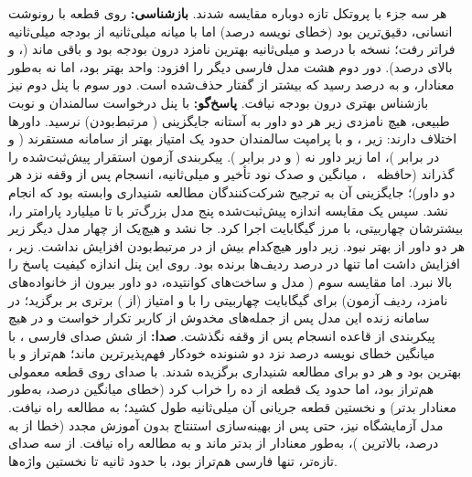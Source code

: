 هر سه جزء با پروتکل تازه دوباره مقایسه شدند. \textbf{بازشناسی:} روی 
قطعه  با رونوشت انسانی،  دقیق‌ترین بود (خطای نویسه
 درصد) اما با میانه  میلی‌ثانیه از بودجه  میلی‌ثانیه
فراتر رفت؛  نسخه  با  درصد و  میلی‌ثانیه بهترین
نامزد درون بودجه بود و باقی ماند (،  و
 بالای  درصد). دور دوم هشت مدل فارسی دیگر را افزود:
  واحد بهتر بود، اما نه به‌طور معنادار، و
 به  درصد رسید که بیشتر از گفتار حذف‌شده است. دور سوم با پنل دوم  نیز بازشناس بهتری درون بودجه نیافت.
\textbf{پاسخ‌گو:} با پنل  درخواست
سالمندان و  نوبت طبیعی، هیچ نامزدی زیر هر دو داور به آستانه جایگزینی
( مرتبط‌بودن) نرسید. داورها اختلاف دارند: زیر ،
 و  با پرامپت سالمندان حدود یک امتیاز بهتر از سامانه
مستقرند ( و  در برابر )، اما زیر داور  نه
( و  در برابر ). پیکربندی  آزمون استقرار
پیش‌ثبت‌شده را گذراند (حافظه ~، میانگین و صدک نود تأخیر  و
 میلی‌ثانیه، انسجام پس از وقفه نزد هر دو داور)؛ جایگزینی آن به ترجیح
شرکت‌کنندگان مطالعه شنیداری وابسته بود که انجام نشد. سپس یک مقایسه اندازه پیش‌ثبت‌شده پنج مدل
بزرگ‌تر با  تا  میلیارد پارامتر را، بیشترشان چهاربیتی، با مرز
 گیگابایت اجرا کرد.  جا نشد و هیچ‌یک از چهار مدل دیگر زیر
هر دو داور از  بهتر نبود. زیر داور  هیچ‌کدام بیش از
 در مرتبط‌بودن افزایش نداشت. زیر ، 
 افزایش داشت اما تنها در  درصد ردیف‌ها برنده بود. روی این پنل اندازه
کیفیت پاسخ را بالا نبرد. اما مقایسه سوم ( مدل و ساخت‌های کوانتیده، دو داور
بیرون از خانواده‌های نامزد،  ردیف آزمون) برای  گیگابایت 
چهاربیتی را با  و  امتیاز (از ) برتری بر  برگزید؛
در سامانه زنده این مدل پس از جمله‌های مخدوش از کاربر تکرار خواست و در هیچ پیکربندی
از قاعده انسجام پس از وقفه نگذشت. \textbf{صدا:} از شش
صدای فارسی ،  با میانگین خطای نویسه  درصد نزد دو
شنونده خودکار فهم‌پذیرترین ماند؛  هم‌تراز و با بهترین
 بود و هر دو برای مطالعه شنیداری برگزیده شدند.  با صدای
 روی قطعه معمولی هم‌تراز بود، اما حدود یک قطعه از ده را خراب کرد (خطای
میانگین  درصد، به‌طور معنادار بدتر) و نخستین قطعه جریانی آن 
میلی‌ثانیه طول کشید؛ به مطالعه راه نیافت. مدل  آزمایشگاه نیز، حتی پس
از بهینه‌سازی استنتاج بدون آموزش مجدد (خطا از  به  درصد، بالاترین
)، به‌طور معنادار از  بدتر ماند و به مطالعه راه نیافت. از سه صدای تازه‌تر،
تنها  فارسی هم‌تراز  بود، با حدود  ثانیه تا نخستین واژه‌ها.

